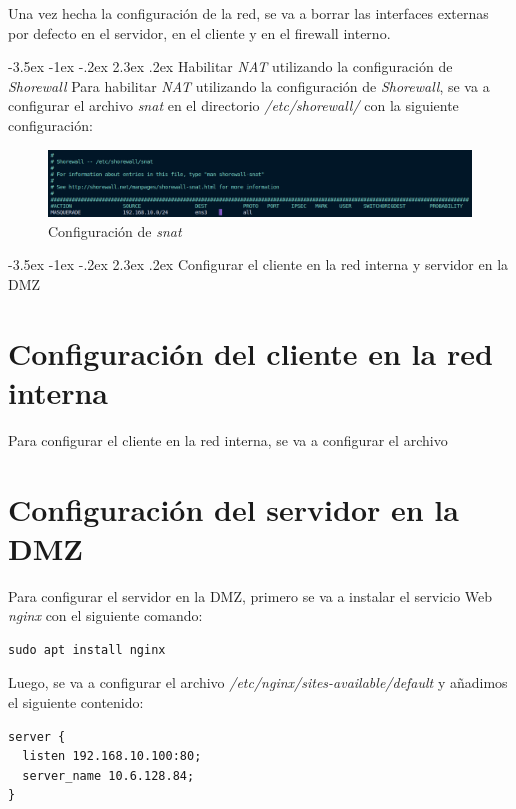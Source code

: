 \documentclass[11pt]{report}
\makeatletter
\renewcommand\chapter{\@startsection{chapter}{0}{\z@}%
    {-3.5ex \@plus -1ex \@minus -.2ex}%
    {2.3ex \@plus.2ex}%
    {\normalfont\Large\bfseries}}
\makeatother
\begin{document}
Una vez hecha la configuración de la red, se va a borrar las interfaces externas por defecto
en el servidor, en el cliente y en el firewall interno.


\cleardoublepage

\chapter{Habilitar \emph{NAT} utilizando la configuración de \emph{Shorewall}}
Para habilitar \emph{NAT} utilizando la configuración de \emph{Shorewall}, se va a 
configurar el archivo \emph{snat} en el directorio \emph{/etc/shorewall/} con la
siguiente configuración:
\begin{figure}[H]
  \centering
  \includegraphics[scale=0.392]{img/snat_config.png}
  \caption{Configuración de \emph{snat}}
  \label{fig:Configuracion de snat}
\end{figure}

\chapter{Configurar el cliente en la red interna y servidor en la DMZ}
\section{Configuración del cliente en la red interna}
Para configurar el cliente en la red interna, se va a configurar el archivo

\section{Configuración del servidor en la DMZ}
Para configurar el servidor en la DMZ, primero se va a instalar el servicio Web
\emph{nginx} con el siguiente comando:
\begin{BVerbatim}
sudo apt install nginx
\end{BVerbatim}

Luego, se va a configurar el archivo \emph{/etc/nginx/sites-available/default} y añadimos
el siguiente contenido:
\begin{verbatim}
server {
  listen 192.168.10.100:80;
  server_name 10.6.128.84;
}
\end{verbatim}
\end{document}
